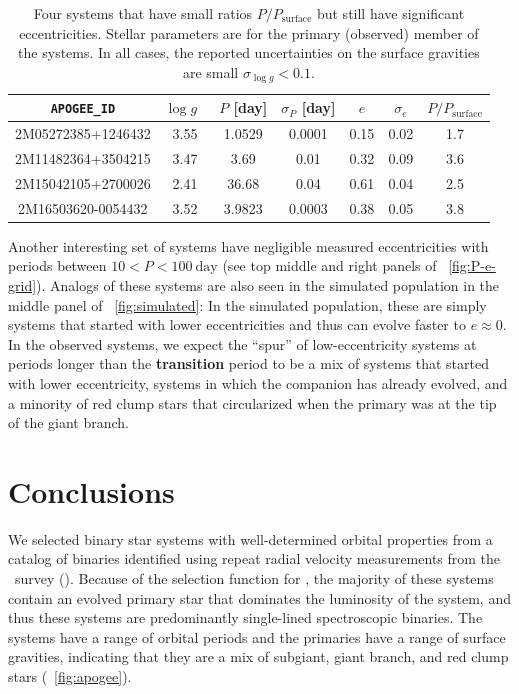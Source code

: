 \documentclass[modern, letterpaper]{aastex62}
\newcommand{\apogee}{\project{\acronym{APOGEE}}}
\newcommand{\logg}{\ensuremath{\log g}}
\newcommand{\Psurf}{\ensuremath{P_\textrm{surface}}}
\renewcommand{\changes}[1]{\textbf{#1}}
\begin{document}
\begin{table}[h]
    \centering
    \begin{tabular}{ c c c c c c c }
    \hline
    \texttt{APOGEE\_ID} & \logg\ & $P$ [day] & $\sigma_P$ [day] & $e$ & $\sigma_e$ & $P/\Psurf$ \\
    \hline
    2M05272385+1246432 & 3.55 & 1.0529 & 0.0001 & 0.15 & 0.02 & 1.7\\
    2M11482364+3504215 & 3.47 & 3.69   & 0.01   & 0.32 & 0.09 & 3.6\\
    2M15042105+2700026 & 2.41 & 36.68  & 0.04   & 0.61 & 0.04 & 2.5\\
    2M16503620-0054432 & 3.52 & 3.9823 & 0.0003 & 0.38 & 0.05 & 3.8\\
    \hline
    \end{tabular}
    \caption{Four systems that have small ratios $P/\Psurf$ but still have
    significant eccentricities.
    Stellar parameters are for the primary (observed) member of the systems.
    In all cases, the reported uncertainties on the surface gravities are small
    $\sigma_{\logg} < 0.1$.
    }
    \label{tbl:except}
\end{table}

Another interesting set of systems have negligible measured eccentricities with
periods between $10 < P < 100~\textrm{day}$ (see top middle and right panels of
\figurename~\ref{fig:P-e-grid}).
Analogs of these systems are also seen in the simulated population in the middle
panel of \figurename~\ref{fig:simulated}: In the simulated population, these are
simply systems that started with lower eccentricities and thus can evolve faster
to $e \approx 0$.
In the observed systems, we expect the ``spur'' of low-eccentricity systems at
periods longer than the \changes{transition} period to be a mix of systems that
started with lower eccentricity, systems in which the companion has already
evolved, and a minority of red clump stars that circularized when the primary
was at the tip of the giant branch.


\section{Conclusions}
\label{sec:conclusions}

We selected binary star systems with well-determined orbital properties from a
catalog of binaries identified using repeat radial velocity measurements from
the \apogee\ survey (\citealt{Price-Whelan:2018}).
Because of the selection function for \apogee, the majority of these systems
contain an evolved primary star that dominates the luminosity of the system, and
thus these systems are predominantly single-lined spectroscopic binaries.
The systems have a range of orbital periods and the primaries have a range of
surface gravities, indicating that they are a mix of subgiant, giant branch, and
red clump stars (\figurename~\ref{fig:apogee}).
\end{document}
